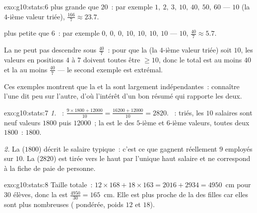 \begin{solution}{exo:g10:stats:6}
 plus grande que $20$~: par exemple
$1,\ 2,\ 3,\ 10,\ 40,\ 50,\ 60$ ---  $10$ (la $4$-ième valeur
triée),  $\frac{166}{7} \approx 23.7$.

 plus petite que $6$~: par exemple
$0,\ 0,\ 0,\ 10,\ 10,\ 10,\ 10$ ---  $10$, 
$\frac{40}{7} \approx 5.7$.

La  ne peut pas descendre sous $\frac{40}{7}$~: pour que la
 (la $4$-ième valeur triée) soit $10$, les valeurs en positions
$4$ à $7$ doivent toutes être $\geq 10$, donc le total est au moins
$40$ et la  au moins $\frac{40}{7}$ --- le second exemple est
extrémal.

Ces exemples montrent que la  et la  sont largement
indépendantes~: connaître l'une dit peu sur l'autre, d'où l'intérêt d'un
bon résumé qui rapporte les deux.
\end{solution}

\begin{solution}{exo:g10:stats:7}
\emph{1.} ~:
$\frac{9 \times 1800 + 12000}{10} = \frac{16200 + 12000}{10} = 2820$.
~: triés, les $10$ salaires sont neuf valeurs $1800$ puis
$12000$~; la  est le  des $5$-ième et $6$-ième valeurs,
toutes deux $1800$~:  $1800$.

\emph{2.} La  ($1800$) décrit le salaire typique~: c'est ce que
gagnent réellement $9$ employés sur $10$. La  ($2820$) est tirée
vers le haut par l'unique haut salaire et ne correspond à la fiche de
paie de personne.
\end{solution}

\begin{solution}{exo:g10:stats:8}
Taille totale~: $12 \times 168 + 18 \times 163 = 2016 + 2934 = 4950$~cm
pour $30$ élèves, donc la  est $\frac{4950}{30} = 165$~cm. Elle
est plus proche de la  des filles car elles sont plus nombreuses
( pondérée, poids $12$ et $18$).
\end{solution}

